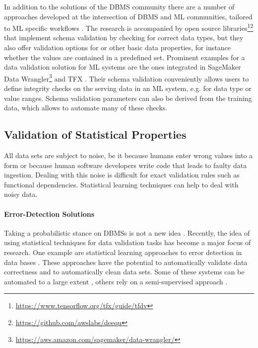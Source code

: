 In addition to the solutions of the DBMS community there are a number of approaches developed at the intersection of DBMS and ML  communities, tailored to ML specific workflows \cite{Breck2019, Schelter2018}. The research is accompanied by open source libraries\footnote{\url{https://www.tensorflow.org/tfx/guide/tfdv}}\footnote{\url{https://github.com/awslabs/deequ}} that implement schema validation by checking for correct data types, but they also offer validation options for or other basic data properties, for instance whether the values are contained in a predefined set. Prominent examples for a data validation solution for ML systems are the ones integrated in SageMaker Data Wrangler\footnote{\url{https://aws.amazon.com/sagemaker/data-wrangler/}} and TFX \cite{Breck2019}. Their schema validation conveniently allows users to define integrity checks on the serving data in an ML system, e.g. for data type or value ranges. Schema validation parameters can also be derived from the training data, which allows to automate many of these checks.

\subsection{Validation of Statistical Properties}

All data sets are subject to noise, be it because humans enter wrong values into a form or because human software developers write code that leads to faulty data ingestion. Dealing with this noise is difficult for exact validation rules such as functional dependencies. Statistical learning techniques can help to deal with noisy data.

\paragraph{Error-Detection Solutions}
Taking a probabilistic stance on DBMSs is not a new idea \cite{Cavallo1987}. Recently, the idea of using statistical techniques for data validation tasks has become a major focus of research. One example are statistical learning approaches to error detection in data bases \cite{Rekatsinas2017,Heidari2019,Huang2017,MahdaviBerlinmahdavilahijani}. These approaches have the potential to automatically validate data correctness and to automatically clean data sets. Some of these systems can be automated to a large extent \cite{Krishnan2017, Krishnan2019}, others rely on a  semi-supervised approach \cite{Krishnan:2016b}.

